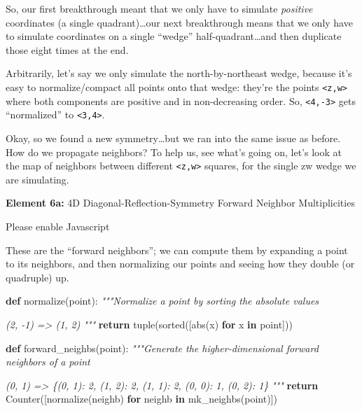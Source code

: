 \documentclass[]{article}
\newenvironment{Shaded}{}{}
\newcommand{\BuiltInTok}[1]{#1}
\newcommand{\CommentTok}[1]{\textcolor[rgb]{0.38,0.63,0.69}{\textit{#1}}}
\newcommand{\ControlFlowTok}[1]{\textcolor[rgb]{0.00,0.44,0.13}{\textbf{#1}}}
\newcommand{\KeywordTok}[1]{\textcolor[rgb]{0.00,0.44,0.13}{\textbf{#1}}}
\newcommand{\NormalTok}[1]{#1}
\begin{document}
So, our first breakthrough meant that we only have to simulate \emph{positive}
coordinates (a single quadrant)\ldots our next breakthrough means that we only
have to simulate coordinates on a single ``wedge'' half-quadrant\ldots and then
duplicate those eight times at the end.

Arbitrarily, let's say we only simulate the north-by-northeast wedge, because
it's easy to normalize/compact all points onto that wedge: they're the points
\texttt{\textless{}z,w\textgreater{}} where both components are positive and in
non-decreasing order. So, \texttt{\textless{}4,-3\textgreater{}} gets
``normalized'' to \texttt{\textless{}3,4\textgreater{}}.

Okay, so we found a new symmetry\ldots but we ran into the same issue as before.
How do we propagate neighbors? To help us, see what's going on, let's look at
the map of neighbors between different \texttt{\textless{}z,w\textgreater{}}
squares, for the single zw wedge we are simulating.

\leavevmode\hypertarget{golSyms4DForward}{}%
\textbf{Element 6a:} 4D Diagonal-Reflection-Symmetry Forward Neighbor
Multiplicities

\leavevmode\hypertarget{golSyms4DForwardCont}{}%
Please enable Javascript

These are the ``forward neighbors''; we can compute them by expanding a point to
its neighbors, and then normalizing our points and seeing how they double (or
quadruple) up.

\begin{Shaded}
\begin{Highlighting}[]
\KeywordTok{def}\NormalTok{ normalize(point):}
    \CommentTok{"""Normalize a point by sorting the absolute values}

\CommentTok{    (2, {-}1)}
\CommentTok{    => (1, 2)}
\CommentTok{    """}
    \ControlFlowTok{return} \BuiltInTok{tuple}\NormalTok{(}\BuiltInTok{sorted}\NormalTok{([}\BuiltInTok{abs}\NormalTok{(x) }\ControlFlowTok{for}\NormalTok{ x }\KeywordTok{in}\NormalTok{ point]))}

\KeywordTok{def}\NormalTok{ forward\_neighbs(point):}
    \CommentTok{"""Generate the higher{-}dimensional forward neighbors of a point}

\CommentTok{    (0, 1)}
\CommentTok{    => \{(0, 1): 2, (1, 2): 2, (1, 1): 2, (0, 0): 1, (0, 2): 1\}}
\CommentTok{    """}
    \ControlFlowTok{return}\NormalTok{ Counter([normalize(neighb) }\ControlFlowTok{for}\NormalTok{ neighb }\KeywordTok{in}\NormalTok{ mk\_neighbs(point)])}
\end{Highlighting}
\end{Shaded}
\end{document}
